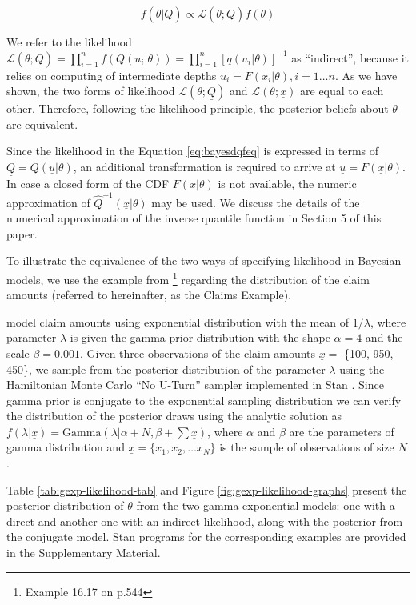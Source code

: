 \documentclass[
  12pt,
]{article}
\begin{document}
\[
f(\theta|\underline{Q}) \propto \mathcal{L}(\theta;\underline{Q})f(\theta)
\label{eq:bayesdqfeq}
\]

We refer to the likelihood \(\mathcal{L}(\theta;\underline{Q})=\prod_{i=1}^{n} f(Q(u_i|\theta))=\prod_{i=1}^n[q(u_i|\theta)]^{-1}\) as ``indirect'', because it relies on computing of intermediate depths \(u_i=F(x_i|\theta), i=1\dots n\). As we have shown, the two forms of likelihood \(\mathcal{L}(\theta;\underline{Q})\) and \(\mathcal{L}(\theta;\underline{x})\) are equal to each other. Therefore, following the likelihood principle, the posterior beliefs about \(\theta\) are equivalent.

Since the likelihood in the Equation \eqref{eq:bayesdqfeq} is expressed in terms of \(\underline {Q}=Q(\underline{u}|\theta)\), an additional transformation is required to arrive at \(\underline{u}=F(\underline{x}|\theta)\). In case a closed form of the CDF \(F(\underline x|\theta)\) is not available, the numeric approximation of \(\widehat{Q}^{-1}(\underline{x}|\theta)\) may be used. We discuss the details of the numerical approximation of the inverse quantile function in Section 5 of this paper.

To illustrate the equivalence of the two ways of specifying likelihood in Bayesian models, we use the example from \citet{klugman2004LossModelsData}\footnote{Example 16.17 on p.544} regarding the distribution of the claim amounts (referred to hereinafter, as the Claims Example).

\citet{klugman2004LossModelsData} model claim amounts using exponential distribution with the mean of \(1/\lambda\), where parameter \(\lambda\) is given the gamma prior distribution with the shape \(\alpha=4\) and the scale \(\beta=0.001\). Given three observations of the claim amounts \(\underline x=\) \{100, 950, 450\}, we sample from the posterior distribution of the parameter \(\lambda\) using the Hamiltonian Monte Carlo ``No U-Turn'' sampler implemented in Stan \citep{standevelopmentteam2021RStanInterfaceStan}. Since gamma prior is conjugate to the exponential sampling distribution \citep{pratt1995IntroductionStatisticalDecision} we can verify the distribution of the posterior draws using the analytic solution as \(f(\lambda|\underline{x})=\text{Gamma}(\lambda| \alpha+N, \beta+\sum \underline{x})\), where \(\alpha\) and \(\beta\) are the parameters of gamma distribution and \(\underline{x}=\{x_1, x_2, \dots x_N\}\) is the sample of observations of size \(N\).

Table \ref{tab:gexp-likelihood-tab} and Figure \ref{fig:gexp-likelihood-graphs} present the posterior distribution of \(\theta\) from the two gamma-exponential models: one with a direct and another one with an indirect likelihood, along with the posterior from the conjugate model. Stan programs for the corresponding examples are provided in the Supplementary Material.
\end{document}
